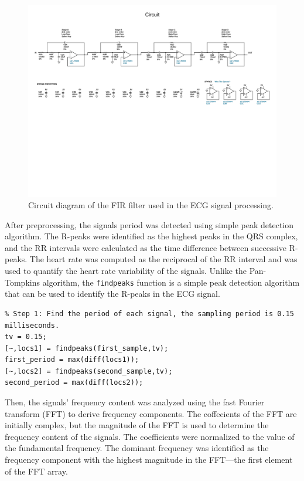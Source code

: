 \documentclass{zc-ust-hw}
\begin{document}
\begin{figure}[p]
  \begin{center}
    \includegraphics[width=0.85\textheight, angle=-90]{figures/circuit.pdf}
  \end{center}
  \caption{Circuit diagram of the FIR filter used in the ECG signal processing.}
  \label{fig:circuit}
\end{figure}


After preprocessing, the signals period was detected using simple peak
detection algorithm. The R-peaks were identified as the highest peaks in the
QRS complex, and the RR intervals were calculated as the time difference
between successive R-peaks. The heart rate was computed as the reciprocal of
the RR interval and was used to quantify the heart rate variability of the
signals. Unlike the Pan-Tompkins algorithm, the \texttt{findpeaks} function is
a simple peak detection algorithm that can be used to identify the R-peaks in
the ECG signal.

\begin{verbatim}
% Step 1: Find the period of each signal, the sampling period is 0.15 milliseconds.
tv = 0.15;
[~,locs1] = findpeaks(first_sample,tv);
first_period = max(diff(locs1));
[~,locs2] = findpeaks(second_sample,tv);
second_period = max(diff(locs2));
\end{verbatim}

Then, the signals' frequency content was analyzed using the fast Fourier
transform (FFT) to derive frequency components. The coffecients of the FFT are
initially complex, but the magnitude of the FFT is used to determine the
frequency content of the signals. The coefficients were normalized to the value
of the fundamental frequency. The dominant frequency was identified as the
frequency component with the highest magnitude in the FFT---the first element of
the FFT array.
\end{document}
